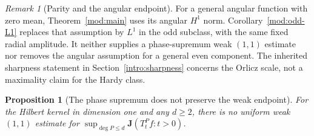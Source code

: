 \documentclass[11pt]{article}
\numberwithin{equation}{section}
\newtheorem{proposition}[theorem]{Proposition}
\theoremstyle{remark}
\newtheorem{remark}[theorem]{Remark}
\theoremstyle{definition}
\begin{document}
\begin{remark}[Parity and the angular endpoint]\label{mod:parity-endpoint}
For a general angular function with zero mean, Theorem~\ref{mod:main}
uses its angular $H^1$ norm. Corollary~\ref{mod:odd-L1} replaces that
assumption by $L^1$ in the odd subclass, with the same fixed radial
amplitude. It neither supplies a phase-supremum weak $(1,1)$ estimate
nor removes the angular assumption for a general even component.
The inherited sharpness statement in Section~\ref{intro:sharpness}
concerns the Orlicz scale, not a maximality claim for the Hardy class.
\end{remark}

\begin{proposition}[The phase supremum does not preserve the weak endpoint]
\label{mod:no-weak-phase-sup}
For the Hilbert kernel in dimension one and any $d\ge2$, there is no
uniform weak $(1,1)$ estimate for
$\sup_{\deg P\le d}\mathbf J(T^P_t f:t>0)$.
\end{proposition}
\end{document}
